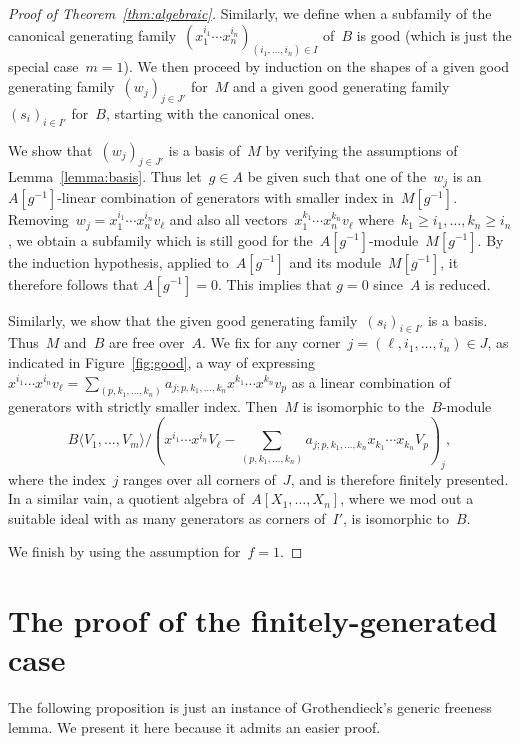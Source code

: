 \documentclass{amsart}
\theoremstyle{definition}
\theoremstyle{plain}
\theoremstyle{remark}
\begin{document}
\begin{proof}[Proof of Theorem~\ref{thm:algebraic}]
Similarly, we define when a subfamily of the canonical generating
family~$(x_1^{i_1} \cdots x_n^{i_n})_{(i_1,\ldots,i_n) \in I}$ of~$B$ is good
(which is just the special case~$m = 1$). We then proceed by induction on the
shapes of a given good generating family~$(w_j)_{j \in J'}$ for~$M$ and a given
good generating family~$(s_i)_{i \in I'}$ for~$B$, starting with the canonical
ones.

We show that~$(w_j)_{j \in J'}$ is a basis of~$M$ by verifying the assumptions
of Lemma~\ref{lemma:basis}. Thus let~$g \in A$ be given such that one of
the~$w_j$ is an $A[g^{-1}]$-linear combination of generators with smaller index
in~$M[g^{-1}]$. Removing~$w_j = x_1^{i_1} \cdots x_n^{i_n} v_\ell$ and also all
vectors~$x_1^{k_1} \cdots x_n^{k_n} v_\ell$ where~$k_1 \geq i_1, \ldots,
k_n \geq i_n$, we obtain a subfamily which is still good for
the~$A[g^{-1}]$-module~$M[g^{-1}]$. By the induction hypothesis, applied
to~$A[g^{-1}]$ and its module~$M[g^{-1}]$, it therefore follows that $A[g^{-1}] = 0$.
This implies that $g = 0$ since~$A$ is reduced.

Similarly, we show that the given good generating family~$(s_i)_{i \in I'}$ is
a basis. Thus~$M$ and~$B$ are free over~$A$. We fix for any corner~$j =
(\ell,i_1,\ldots,i_n) \in J$, as indicated in Figure~\ref{fig:good},
a way of expressing~$x^{i_1} \cdots x^{i_n} v_\ell = \sum_{(p,k_1,\ldots,k_n)}
a_{j; p,k_1,\ldots,k_n} x^{k_1} \cdots x^{k_n} v_p$ as a linear combination of
generators with strictly smaller index. Then~$M$ is isomorphic to
the~$B$-module
\[ B\langle V_1,\ldots, V_m\rangle/
  (x^{i_1} \cdots x^{i_n} V_\ell - \textstyle\sum_{(p,k_1,\ldots,k_n)}
  a_{j; p,k_1,\ldots,k_n} x_{k_1} \cdots x_{k_n} V_p)_j,
\]
where the index~$j$ ranges over all corners of~$J$, and is therefore finitely
presented. In a similar vain, a quotient algebra of~$A[X_1,\ldots,X_n]$, where
we mod out a suitable ideal with as many generators as corners of~$I'$, is
isomorphic to~$B$.

We finish by using the assumption for~$f = 1$.
\end{proof}


\section{The proof of the finitely-generated case}

The following proposition is just an instance of Grothendieck's generic
freeness lemma. We present it here because it admits an easier proof.
\end{document}
